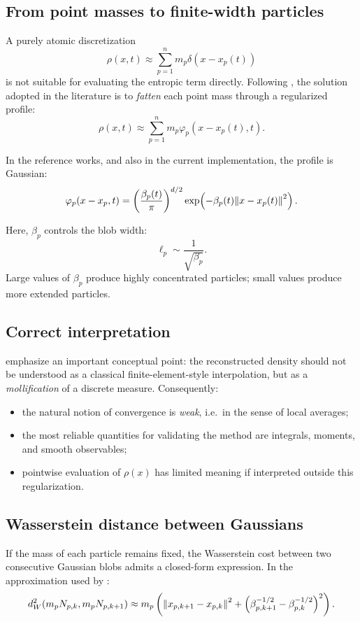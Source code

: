 \documentclass[11pt,a4paper]{article}
\begin{document}
\subsection{From point masses to finite-width particles}
A purely atomic discretization
\begin{equation}
\rho(x,t) \approx \sum_{p=1}^{n} m_p \delta(x-x_p(t))
\end{equation}
is not suitable for evaluating the entropic term directly. Following \citet{carrillo2019,carrillo2017}, the solution adopted in the literature is to \emph{fatten} each point mass through a regularized profile:
\begin{equation}
\rho(x,t) \approx \sum_{p=1}^{n} m_p \varphi_p(x-x_p(t),t).
\end{equation}

In the reference works, and also in the current implementation, the profile is Gaussian:
\begin{equation}
\varphi_p(x-x_p,t)
=
\left(\frac{\beta_p(t)}{\pi}\right)^{d/2}
\exp\!\left(-\beta_p(t)\norm{x-x_p(t)}^2\right).
\end{equation}

Here, $\beta_p$ controls the blob width:
\begin{equation}
\ell_p \sim \frac{1}{\sqrt{\beta_p}}.
\end{equation}
Large values of $\beta_p$ produce highly concentrated particles; small values produce more extended particles.

\subsection{Correct interpretation}
\citet{pandolfi2025} emphasize an important conceptual point: the reconstructed density should not be understood as a classical finite-element-style interpolation, but as a \emph{mollification} of a discrete measure. Consequently:
\begin{itemize}[leftmargin=*]
  \item the natural notion of convergence is \emph{weak}, i.e.\ in the sense of local averages;
  \item the most reliable quantities for validating the method are integrals, moments, and smooth observables;
  \item pointwise evaluation of $\rho(x)$ has limited meaning if interpreted outside this regularization.
\end{itemize}

\subsection{Wasserstein distance between Gaussians}
If the mass of each particle remains fixed, the Wasserstein cost between two consecutive Gaussian blobs admits a closed-form expression. In the approximation used by \citet{pandolfi2023}:
\begin{equation}
d_W^2\!\left(m_p N_{p,k},m_p N_{p,k+1}\right)
\approx
m_p \left(
\norm{x_{p,k+1}-x_{p,k}}^2 +
\left(\beta_{p,k+1}^{-1/2} - \beta_{p,k}^{-1/2}\right)^2
\right).
\end{equation}
\end{document}
